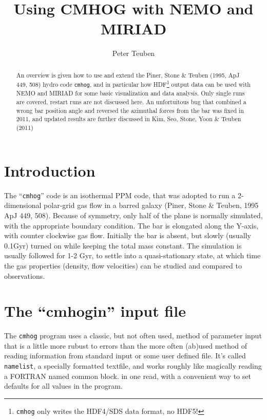 \documentclass[10pt,dvips]{article}
\title{Using CMHOG with NEMO and MIRIAD}
\author{Peter Teuben}
\begin{document}
\maketitle


\begin{abstract}

An overview is given how to use and extend 
the Piner, Stone \& Teuben (1995, ApJ 449, 508) hydro code
{\tt cmhog}, and in particular how 
HDF\footnote{{\tt cmhog} only writes the HDF4/SDS data format, no HDF5!}
output data can be used with
NEMO and MIRIAD for some basic visualization and data analysis.
Only single runs are covered, restart runs are not discussed here.
An unfortuitous bug that combined a wrong bar position angle and reversed
the azimuthal forces from the bar was fixed in 2011, and updated
results are further discussed in Kim, Seo, Stone, Yoon \& Teuben (2011)

\end{abstract}

\section{Introduction}

The ``{\tt cmhog}'' code is an isothermal PPM code, 
that was adopted to run a 2-dimensional polar-grid gas flow in a 
barred galaxy (Piner, Stone \& Teuben, 1995 ApJ 449, 508).
Because of symmetry, only half of the plane is normally
simulated, with the appropriate  boundary condition.
The bar is elongated along the Y-axis, with 
counter clockwise gas flow. Initially the bar is absent, but
slowly (usually 0.1Gyr) turned on while keeping
the total mass constant. The simulation
is usually followed for 1-2 Gyr, to settle into a quasi-stationary
state, at which time the gas properties (density, flow velocities)
can be studied and compared to observations.

\section{The ``cmhogin'' input file}

The {\tt cmhog} program uses a classic, but not often used, method of parameter input
that is a little more rubust to errors than the more often (ab)used method
of reading information from standard input or some user defined file.
It's called {\tt namelist},
a specially formatted textfile, 
and works roughly like magically reading a FORTRAN named common block.
in one read, with a convenient way to set defaults for all values
in the program.
\end{document}

